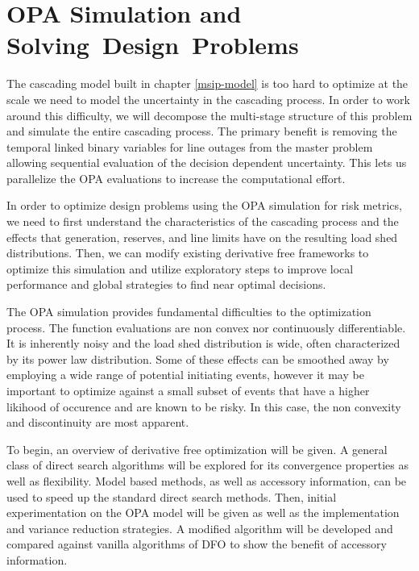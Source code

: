 \newcommand{\mypathdfo}{../thesis/dfo}
\newcommand{\mypathdfodata}{../thesis/dfo/data}
\newcommand{\scd}{\cD_\oplus}
\newcommand{\btu}{\bigtriangleup}
\chapter{OPA Simulation and Solving~Design~Problems}

The cascading model built in chapter \ref{msip-model} is too hard to optimize at the scale we need to model the uncertainty in the cascading process.  In order to work around this difficulty, we will decompose the multi-stage structure of this problem and simulate the entire cascading process.  The primary benefit is removing the temporal linked binary variables for line outages from the master problem allowing sequential evaluation of the decision dependent uncertainty.  This lets us parallelize the OPA evaluations to increase the computational effort.

In order to optimize design problems using the OPA simulation for risk metrics, we need to first understand the characteristics of the cascading process and the effects that generation, reserves, and line limits have on the resulting load shed distributions.  Then, we can modify existing derivative free frameworks to optimize this simulation and utilize exploratory steps to improve local performance and global strategies to find near optimal decisions.

The OPA simulation provides fundamental difficulties to the optimization process.  The function evaluations are non convex nor continuously differentiable.  It is inherently noisy and the load shed distribution is wide, often characterized by its power law distribution.  Some of these effects can be smoothed away by employing a wide range of potential initiating events, however it may be important to optimize against a small subset of events that have a higher likihood of occurence and are known to be risky.  In this case, the non convexity and discontinuity are most apparent.

To begin, an overview of derivative free optimization will be given.  A general class of direct search algorithms will be explored for its convergence properties as well as flexibility.  Model based methods, as well as accessory information, can be used to speed up the standard direct search methods.  Then, initial experimentation on the OPA model will be given as well as the implementation and variance reduction strategies.  A modified algorithm will be developed and compared against vanilla algorithms of DFO to show the benefit of accessory information. 

